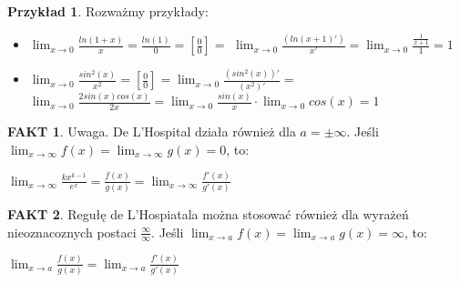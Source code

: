 \documentclass{article}
\theoremstyle{definition}
\theoremstyle{definition}
\theoremstyle{definition}
\newtheorem{pk}{Przykład}[subsection]
\theoremstyle{definition}
\newtheorem*{fakt}{FAKT}
\begin{document}
\begin{pk}
    Rozważmy przykłady:
    \begin{itemize}
        \item $\lim_{x\rightarrow 0} \frac{ln(1+x)}{x} = \frac{ln(1)}{0} = \left[\frac{0}{0}\right]=$
        $\lim_{x\rightarrow 0} \frac{(ln(x+1)')}{x'} = \lim_{x\rightarrow 0} \frac{\frac{1}{x+1}}{1}=1$
        \item $\lim_{x\rightarrow 0} \frac{sin^2(x)}{x^2} = \left[\frac{0}{0}\right] = \lim_{x\rightarrow 0} \frac{(sin^2(x))'}{(x^2)'}=$
        $\lim_{x\rightarrow 0} \frac{2sin(x)cos(x)}{2x} = \lim_{x\rightarrow 0} \frac{sin(x)}{x}\cdot \lim_{x\rightarrow 0} cos(x) = 1$
    \end{itemize}
\end{pk}

\begin{fakt}
    Uwaga. De L'Hospital działa również dla $a=\pm\infty$. Jeśli $\lim_{x\rightarrow \infty} f(x)=\lim_{x\rightarrow\infty} g(x)=0$, to:
    \begin{center}
        $\lim_{x\rightarrow \infty} \frac{kx^{k-1}}{e^x}=\frac{f(x)}{g(x)} = \lim_{x\rightarrow \infty} \frac{f'(x)}{g'(x)}$ 
    \end{center}
\end{fakt}

\begin{fakt}
    Regułę de L'Hospiatala można stosować również dla wyrażeń nieoznacoznych postaci $\frac{\infty}{\infty}$. 
    Jeśli $\lim_{x\rightarrow a} f(x) = \lim_{x\rightarrow a } g(x) = \infty$, to:
    \begin{center}
        $\lim_{x\rightarrow a} \frac{f(x)}{g(x)}= \lim_{x\rightarrow a} \frac{f'(x)}{g'(x)}$
    \end{center}
\end{fakt}
\end{document}

